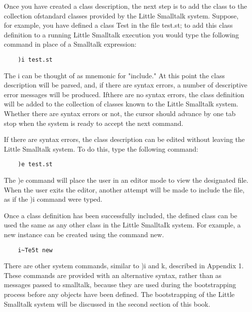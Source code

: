 
Once you have created a class description, the next step is to add the class
to the collection ofstandard classes provided by the Little Smalltalk system.
Suppose, for example, you have defined a class Test in the file test.st; to
add this class definition to a running Little Smalltalk execution you would
type the following command in place of a Smalltalk expression:
\begin{lstlisting}
    )i test.st
\end{lstlisting}

The i can be thought of as mnemonic for "include." At this point the
class description will be parsed, and, if there are syntax errors, a number
of descriptive error messages will be produced. Ifthere are no syntax errors,
the class definition will be added to the collection of classes known to the
Little Smalltalk system. Whether there are syntax errors or not, the cursor
should advance by one tab stop when the system is ready to accept the
next command.

If there are syntax errors, the class description can be edited without
leaving the Little Smalltalk system. To do this, type the following command:
\begin{lstlisting}
    )e test.st
\end{lstlisting}

The )e command will place the user in an editor mode to view the
designated file. When the user exits the editor, another attempt will be
made to include the file, as if the )i command were typed.

Once a class definition has been successfully included, the defined class
can be used the same as any other class in the Little SmalltaIk system. For
example, a new instance can be created using the command new.
\begin{lstlisting}
    i~Te5t new
\end{lstlisting}

There are other system commands, similar to )i and k, described in
Appendix 1. These commands are provided with an alternative syntax,
rather than as messages passed to smalltalk, because they are used during
the bootstrapping process before any objects have been defined. The bootstrapping of the Little Smalltalk system will be discussed in the second
section of this book.
